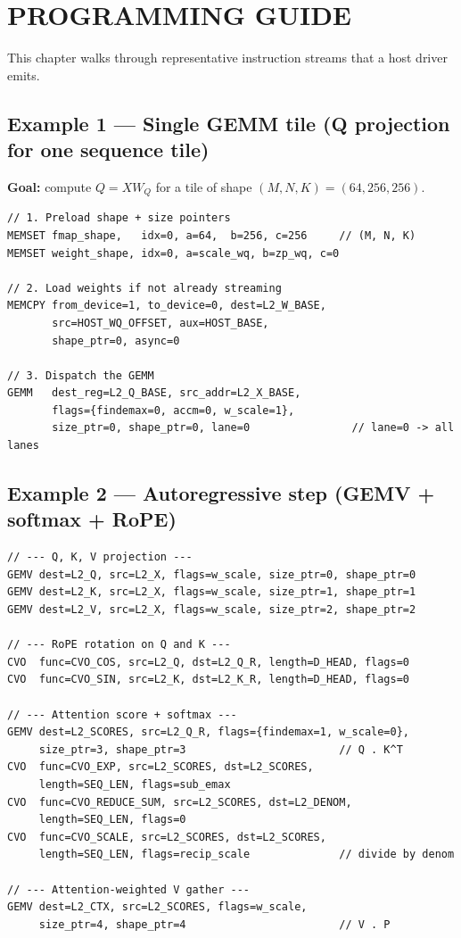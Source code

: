 \documentclass[11pt,a4paper,twoside,openany]{report}
\begin{document}
\newpage

\chapter{PROGRAMMING GUIDE}

This chapter walks through representative instruction streams that a
host driver emits.

\section{Example 1 --- Single GEMM tile (Q projection for one sequence tile)}

\textbf{Goal:} compute $Q = X W_Q$ for a tile of shape
$(M, N, K) = (64, 256, 256)$.

\begin{lstlisting}[style=sv]
// 1. Preload shape + size pointers
MEMSET fmap_shape,   idx=0, a=64,  b=256, c=256     // (M, N, K)
MEMSET weight_shape, idx=0, a=scale_wq, b=zp_wq, c=0

// 2. Load weights if not already streaming
MEMCPY from_device=1, to_device=0, dest=L2_W_BASE,
       src=HOST_WQ_OFFSET, aux=HOST_BASE,
       shape_ptr=0, async=0

// 3. Dispatch the GEMM
GEMM   dest_reg=L2_Q_BASE, src_addr=L2_X_BASE,
       flags={findemax=0, accm=0, w_scale=1},
       size_ptr=0, shape_ptr=0, lane=0                // lane=0 -> all lanes
\end{lstlisting}

\section{Example 2 --- Autoregressive step (GEMV + softmax + RoPE)}

\begin{lstlisting}[style=sv]
// --- Q, K, V projection ---
GEMV dest=L2_Q, src=L2_X, flags=w_scale, size_ptr=0, shape_ptr=0
GEMV dest=L2_K, src=L2_X, flags=w_scale, size_ptr=1, shape_ptr=1
GEMV dest=L2_V, src=L2_X, flags=w_scale, size_ptr=2, shape_ptr=2

// --- RoPE rotation on Q and K ---
CVO  func=CVO_COS, src=L2_Q, dst=L2_Q_R, length=D_HEAD, flags=0
CVO  func=CVO_SIN, src=L2_K, dst=L2_K_R, length=D_HEAD, flags=0

// --- Attention score + softmax ---
GEMV dest=L2_SCORES, src=L2_Q_R, flags={findemax=1, w_scale=0},
     size_ptr=3, shape_ptr=3                        // Q . K^T
CVO  func=CVO_EXP, src=L2_SCORES, dst=L2_SCORES,
     length=SEQ_LEN, flags=sub_emax
CVO  func=CVO_REDUCE_SUM, src=L2_SCORES, dst=L2_DENOM,
     length=SEQ_LEN, flags=0
CVO  func=CVO_SCALE, src=L2_SCORES, dst=L2_SCORES,
     length=SEQ_LEN, flags=recip_scale              // divide by denom

// --- Attention-weighted V gather ---
GEMV dest=L2_CTX, src=L2_SCORES, flags=w_scale,
     size_ptr=4, shape_ptr=4                        // V . P
\end{lstlisting}
\end{document}
